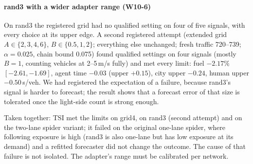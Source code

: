 \paragraph{rand3 with a wider adapter range (W10-6)} On rand3 the registered grid had no qualified setting on four of five signals, with
every choice at its upper edge. A second registered attempt (extended grid $A\in\{2,3,4,6\}$, $B\in\{0.5,1,2\}$; everything else unchanged;
fresh traffic 720--739; $\alpha=0.025$, chain bound 0.075) found qualified settings on four signals (mostly $B=1$, counting vehicles at
2--5\,m/s fully) and met every limit: fuel $-2.17\%$ $[-2.61,-1.69]$, agent time $-0.03$ (upper $+0.15$), city upper $-0.24$, human upper
$-0.50$\,s/veh. We had registered the expectation of a failure, because rand3's signal is harder to forecast; the result shows that a
forecast error of that size is tolerated once the light-side count is strong enough.

Taken together: TSI met the limits on grid4, on rand3 (second attempt) and on the two-lane spider variant; it failed on the original
one-lane spider, where following exposure is high (rand3 is also one-lane but has low exposure at its demand) and a refitted forecaster
did not change the outcome. The cause of that failure is not isolated. The adapter's range must be calibrated per network.
\begin{table}[t]\centering\footnotesize\setlength{\tabcolsep}{2.5pt}
\caption{Wave 10, served-answer diagnostics (two signals per network, TUNE traffic, full episodes). Shadow: the forecast is computed but not
delivered. Following exposure: human-seconds within 50\,m behind an agent commanded $>0.5$\,m/s below its allowed speed, per commanded
agent-second (an exposure proxy, not causal delay).}\label{tab:w10}
\end{table}

